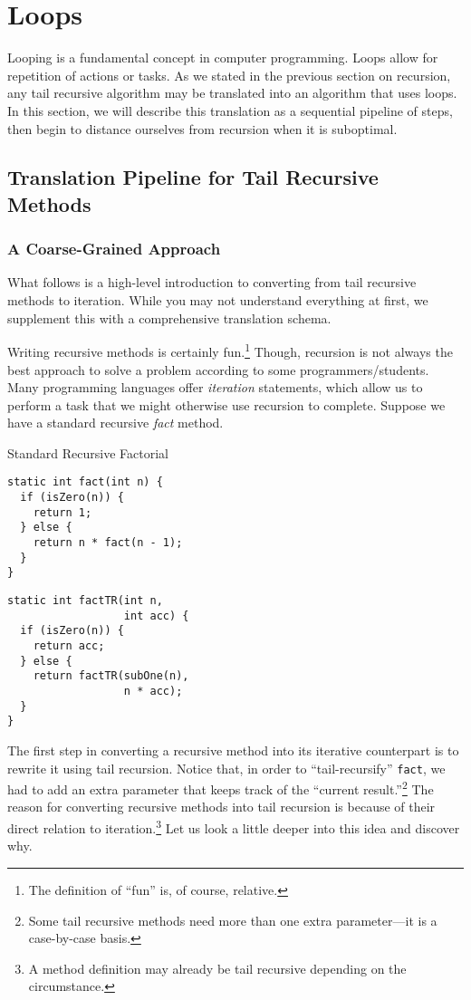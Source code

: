 \section{Loops}

Looping is a fundamental concept in computer programming. 
Loops allow for repetition of actions or tasks. 
As we stated in the previous section on recursion, any tail recursive algorithm may be translated into an algorithm that uses loops. 
In this section, we will describe this translation as a sequential pipeline of steps, then begin to distance ourselves from recursion when it is suboptimal.

\subsection{Translation Pipeline for Tail Recursive Methods}
\subsubsection*{A Coarse-Grained Approach}
What follows is a high-level introduction to converting from tail recursive methods to iteration. 
While you may not understand everything at first, we supplement this with a comprehensive translation schema.

Writing recursive methods is certainly fun.\footnote{The definition of ``fun'' is, of course, relative.} 
Though, recursion is not always the best approach to solve a problem according to some programmers/students. 
Many programming languages offer \emph{iteration} statements, which allow us to perform a task that we might otherwise use recursion to complete. 
Suppose we have a standard recursive \emph{fact} method. 

\begin{clrr}[]{Standard Recursive Factorial}
\begin{lstlisting}[language=MyJavaNF]
static int fact(int n) {
  if (isZero(n)) { 
    return 1; 
  } else {
    return n * fact(n - 1);
  }
}
\end{lstlisting}
\tcblower
\begin{lstlisting}[language=MyJavaNF]
static int factTR(int n, 
                  int acc) {
  if (isZero(n)) { 
    return acc; 
  } else {
    return factTR(subOne(n), 
                  n * acc);
  }
}
\end{lstlisting}
\end{clrr}

The first step in converting a recursive method into its iterative counterpart is to rewrite it using tail recursion. 
Notice that, in order to ``tail-recursify'' \texttt{fact}, we had to add an extra parameter that keeps track of the ``current result.''\footnote{Some tail recursive methods need more than one extra parameter---it is a case-by-case basis.} 
The reason for converting recursive methods into tail recursion is because of their direct relation to iteration.\footnote{A method definition may already be tail recursive depending on the circumstance.} 
Let us look a little deeper into this idea and discover why.

